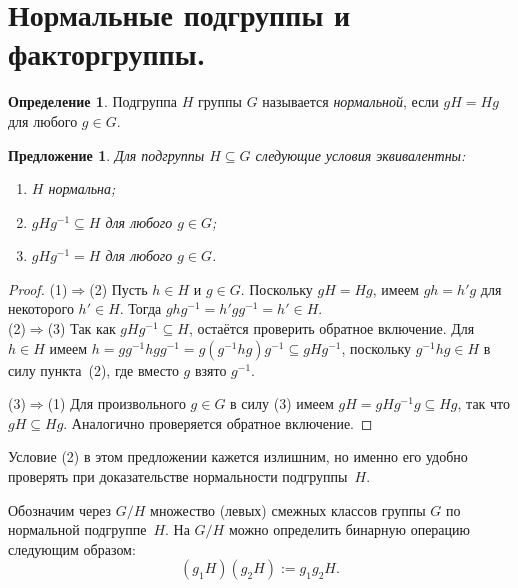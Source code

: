 \documentclass[a4paper, 12pt]{article}
\newtheorem{proposition}{Предложение}
\theoremstyle{definition}
\newtheorem{definition}{Определение}
\theoremstyle{remark}
\begin{document}
\section{Нормальные подгруппы и факторгруппы.}

\begin{definition}
Подгруппа $H$ группы $G$ называется {\it нормальной}, если $gH=Hg$
для любого $g\in G$.
\end{definition}

\begin{proposition}
Для подгруппы $H \subseteq G$ следующие условия эквивалентны:

\vspace{-2mm}
\begin{enumerate}
\item[(1)]
$H$ нормальна;

\item[(2)]
$gHg^{-1} \subseteq H$ для любого $g \in G$;

\item[(3)]
$gHg^{-1}=H$ для любого $g\in G$.
\end{enumerate}
\end{proposition}

\vspace{-6mm}

\begin{proof}
(1)$\Rightarrow$(2) Пусть $h \in H$ и $g \in G$. 
Поскольку $gH =
Hg$, имеем $gh = h'g$ для некоторого $h' \in H$. 
Тогда $ghg^{-1} =
h'gg^{-1} = h' \in H$.\\
(2)$\Rightarrow$(3) Так как $gHg^{-1} \subseteq H$, остаётся
проверить обратное включение. 
Для $h \in H$ имеем $h = gg^{-1} h g
g^{-1} = g(g^{-1}hg)g^{-1} \subseteq gHg^{-1}$, поскольку $g^{-1}hg
\in H$ в силу пункта~(2), где вместо $g$ взято $g^{-1}$.

(3)$\Rightarrow$(1) Для произвольного $g \in G$ в силу (3) имеем $gH
= gHg^{-1} g \subseteq Hg$, так что $gH \subseteq Hg$. Аналогично
проверяется обратное включение.
\end{proof}
\vspace{-1mm}

Условие (2) в этом предложении кажется излишним, но именно его
удобно проверять при доказательстве нормальности подгруппы~$H$.

Обозначим через $G/H$ множество (левых) смежных классов группы $G$
по нормальной подгруппе~$H$. На $G/H$ можно определить бинарную
операцию следующим образом:
$$
(g_1H)(g_2H):=g_1g_2H.
$$
\end{document}
